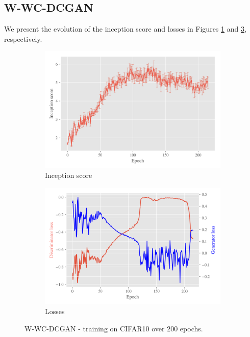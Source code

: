 \subsection{W-WC-DCGAN}
\label{sec:exp-w-wc-dcgan}
We present the evolution of the inception score and losses in Figures \ref{fig:exp-w-wc-dcgan-is} and \ref{fig:exp-w-wc-dcgan-losses}, respectively. 
   
\begin{figure}[t!]
    \centering
    \begin{subfigure}[t]{0.49\textwidth}
        \centering
		\includegraphics[width=\textwidth]{../code/results/figures/w-wc-dcgan_cifar10_is.png}
		\caption{Inception score}
		\label{fig:exp-w-wc-dcgan-is}
    \end{subfigure}
    \begin{subfigure}[t]{0.49\textwidth}
        \centering
        \includegraphics[width=\textwidth]{../code/results/figures/w-wc-dcgan_cifar10_losses.png}
		\caption{Losses}
		\label{fig:exp-w-wc-dcgan-losses}
    \end{subfigure}
    \caption{W-WC-DCGAN - training on CIFAR10 over 200 epochs.}
\end{figure}